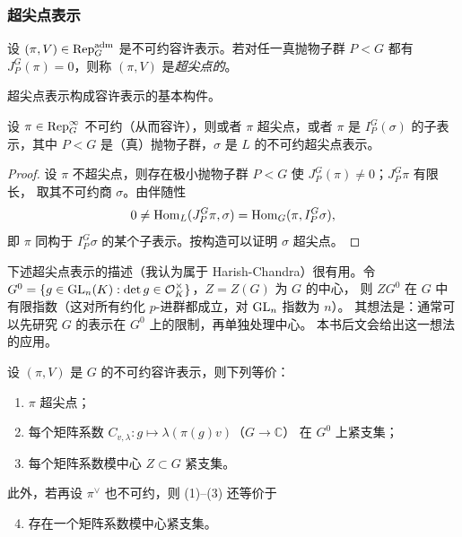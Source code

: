 \subsubsection{超尖点表示}

\begin{definition}
设 $(\pi,V)\in\mathrm{Rep}^{\mathrm{adm}}_G$ 是不可约容许表示。若对任一真抛物子群 $P<G$ 都有
$J^G_P(\pi)=0$，则称 $(\pi,V)$ 是\emph{超尖点的}。
\end{definition}

超尖点表示构成容许表示的基本构件。

\begin{lemma}
设 $\pi\in\mathrm{Rep}^{\infty}_G$ 不可约（从而容许），则或者 $\pi$ 超尖点，或者 $\pi$ 是
$I^G_P(\sigma)$ 的子表示，其中 $P<G$ 是（真）抛物子群，$\sigma$ 是 $L$ 的不可约超尖点表示。
\end{lemma}

\begin{proof}
设 $\pi$ 不超尖点，则存在极小抛物子群 $P<G$ 使 $J^G_P(\pi)\neq 0$；$J^G_P\pi$ 有限长，
取其不可约商 $\sigma$。由伴随性
\[
0\neq\mathrm{Hom}_L(J^G_P\pi,\sigma)=\mathrm{Hom}_G(\pi,I^G_P\sigma),
\]
即 $\pi$ 同构于 $I^G_P\sigma$ 的某个子表示。按构造可以证明 $\sigma$ 超尖点。
\end{proof}

下述超尖点表示的描述（我认为属于 Harish-Chandra）很有用。令
$G^{0}=\{g\in\mathrm{GL}_n(K):\det g\in\mathcal{O}_K^{\times}\}$，$Z=Z(G)$ 为 $G$ 的中心，
则 $ZG^{0}$ 在 $G$ 中有限指数（这对所有约化 $p$-进群都成立，对 $\mathrm{GL}_n$ 指数为 $n$）。
其想法是：通常可以先研究 $G$ 的表示在 $G^{0}$ 上的限制，再单独处理中心。
本书后文会给出这一想法的应用。

\begin{lemma}
设 $(\pi,V)$ 是 $G$ 的不可约容许表示，则下列等价：
\begin{enumerate}[label=(\arabic*),leftmargin=2.2em]
\item $\pi$ 超尖点；
\item 每个矩阵系数 $C_{v,\lambda}\colon g\mapsto\lambda(\pi(g)v)$（$G\to\mathbb{C}$）
      在 $G^{0}$ 上紧支集；
\item 每个矩阵系数模中心 $Z\subset G$ 紧支集。
\end{enumerate}
此外，若再设 $\pi^{\vee}$ 也不可约，则 (1)--(3) 还等价于
\begin{enumerate}[label=(\arabic*),leftmargin=2.2em]\setcounter{enumi}{3}
\item 存在一个矩阵系数模中心紧支集。
\end{enumerate}
\end{lemma}

